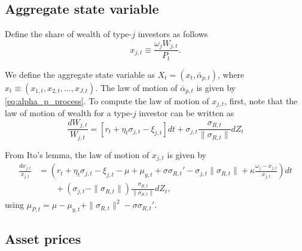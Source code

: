 \subsection{Aggregate state variable}

Define the share of wealth of type-$j$ investors as follows
\begin{equation}
    x_{j,t} \equiv \frac{\omega_j W_{j,t}}{P_t}.
\end{equation}

We define the aggregate state variable as $X_t = (x_t, \overline{\alpha}_{p,t})$, where $x_t \equiv (x_{1,t}, x_{2,t}, \ldots, x_{J,t})$. The law of motion of $\overline{\alpha}_{p,t}$ is given by \eqref{eq:alpha_p_process}. To compute the law of motion of $x_{j,t}$, first, note that the law of motion of wealth for a type-$j$ investor can be written as
\begin{equation}
    \frac{d W_{j,t}}{W_{j,t}} = \left[ r_t + \eta_t \sigma_{j,t} - \xi_{j,t} \right]dt + \sigma_{j,t} \frac{\sigma_{R,t}}{\|\sigma_{R,t}\|} d Z_t
\end{equation}

From Ito's lemma, the law of motion of $x_{j,t}$ is given by
\begin{align}
    \frac{d x_{j,t}}{x_{j,t}} &= \left( r_t + \eta_t \sigma_{j,t} - \xi_{j,t} -\mu + \mu_{y,t} + \sigma \sigma_{R,t}'  - \sigma_{j,t} \|\sigma_{R,t}\|  +\kappa \frac{\omega_j-x_{j,t}}{x_{j,t}}  \right) dt \nonumber\\
    &\qquad + (\sigma_{j,t} - \|\sigma_{R,t}\|)\frac{\sigma_{R,t}}{\|\sigma_{R,t}\|} d Z_t,
\end{align}
using $\mu_{P,t} =\mu - \mu_{y,t} + \|\sigma_{R,t}\|^2 - \sigma \sigma_{R,t}' $. 

\subsection{Asset prices}


